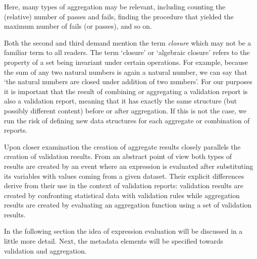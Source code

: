 Here, many types of aggregation may be relevant, including counting the
(relative) number of passes and fails, finding the procedure that yielded the
maximum number of fails (or passes), and so on.

Both the second and third demand mention the term \emph{closure} which may not
be a familiar term to all readers. The term `closure' or `algebraic closure'
refers to the property of a set being invariant under certain operations. For
example, because the sum of any two natural numbers is again a natural number,
we can say that ‘the natural numbers are closed under addition of two numbers’.
For our purposes it is important that the result of combining or aggregating a
validation report is also a validation report, meaning that it has exactly the
same structure (but possibly different content) before or after aggregation. If
this is not the case, we run the risk of defining new data structures for each
aggregate or combination of reports.


Upon closer examination the creation of aggregate results closely parallels the
creation of validation results. From an abstract point of view both 
types of results are created by an event where an expression is evaluated
after substituting its variables with values coming from a given dataset. Their
explicit differences derive from their use in the context of validation
reports: validation results are created by confronting statistical data with
validation rules while aggregation results are created by evaluating an
aggregation function using a set of validation results. 

In the following section the idea of expression evaluation will be discussed
in a little more detail. Next, the metadata elements will be specified towards
validation and aggregation.



